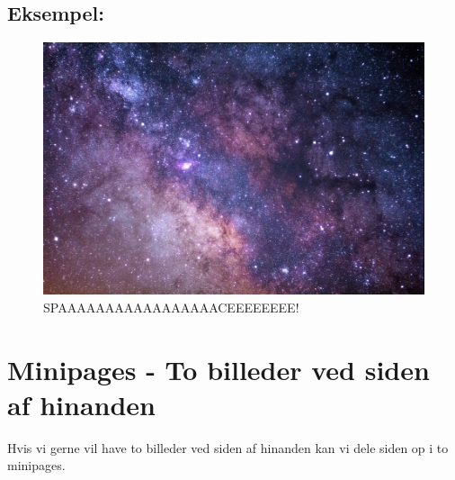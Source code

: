 \subsection{Eksempel:}
\lipsum[4]    %
\begin{figure} %
    \centering
    \includegraphics[width=0.95\linewidth]{media/AAUgraphics/frontpageImage.jpg} 
    \caption{SPAAAAAAAAAAAAAAAAACEEEEEEEE!}
    \label{fig:wraptable}
\end{figure}
\lipsum[4-5]    %

\pagebreak

\section{Minipages - To billeder ved siden af hinanden}
Hvis vi gerne vil have to billeder ved siden af hinanden kan vi dele siden op i to minipages.

